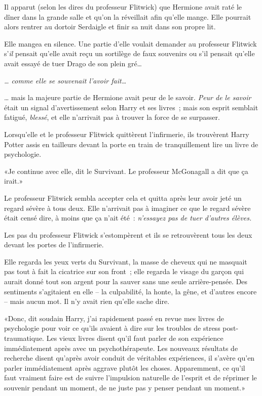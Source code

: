 Il apparut (selon les dires du professeur Flitwick) que Hermione avait raté le dîner dans la grande salle et qu'on la réveillait afin qu'elle mange. Elle pourrait alors rentrer au dortoir Serdaigle et finir sa nuit dans son propre lit.

Elle mangea en silence. Une partie d'elle voulait demander au professeur Flitwick s'\emph{il} pensait qu'elle avait reçu un sortilège de faux souvenirs ou s'il pensait qu'elle avait essayé de tuer Drago de son plein gré…

\emph{… comme elle se souvenait l'avoir fait…}

… mais la majeure partie de Hermione avait peur de le savoir. \emph{Peur de le savoir} était un signal d'avertissement selon Harry et ses livres~; mais son esprit semblait fatigué, \emph{blessé}, et elle n'arrivait pas à trouver la force de se surpasser.

Lorsqu'elle et le professeur Flitwick quittèrent l'infirmerie, ils trouvèrent Harry Potter assis en tailleurs devant la porte en train de tranquillement lire un livre de psychologie.

«Je continue avec elle, dit le Survivant. Le professeur McGonagall a dit que ça irait.»

Le professeur Flitwick sembla accepter cela et quitta après leur avoir jeté un regard sévère à tous deux. Elle n'arrivait pas à imaginer ce que le regard sévère était censé dire, à moins que ça n'ait été~: \emph{n'essayez pas de tuer d'autres élèves.}

Les pas du professeur Flitwick s'estompèrent et ils se retrouvèrent tous les deux devant les portes de l'infirmerie.

Elle regarda les yeux verts du Survivant, la masse de cheveux qui ne masquait pas tout à fait la cicatrice sur son front~; elle regarda le visage du garçon qui aurait donné tout son argent pour la sauver sans une seule arrière-pensée. Des sentiments s'agitaient en elle -- la culpabilité, la honte, la gêne, et d'autres encore -- mais aucun mot. Il n'y avait rien qu'elle sache dire.

«Donc, dit soudain Harry, j'ai rapidement passé en revue mes livres de psychologie pour voir ce qu'ils avaient à dire sur les troubles de stress post-traumatique. Les vieux livres disent qu'il faut parler de son expérience immédiatement après avec un psychothérapeute. Les nouveaux résultats de recherche disent qu'après avoir conduit de véritables expériences, il s'avère qu'en parler immédiatement après aggrave plutôt les choses. Apparemment, ce qu'il faut vraiment faire est de suivre l'impulsion naturelle de l'esprit et de réprimer le souvenir pendant un moment, de ne juste pas y penser pendant un moment.»

